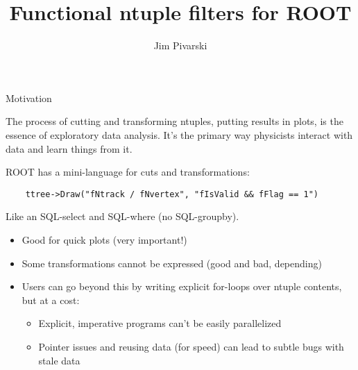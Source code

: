 \documentclass{beamer}
\title{Functional ntuple filters for ROOT}
\author{Jim Pivarski}
\begin{document}
\begin{frame}
  \titlepage
\end{frame}

\begin{frame}[fragile]{Motivation}

\begin{block}{}
The process of cutting and transforming ntuples, putting results in plots, is the essence of exploratory data analysis. It's the primary way physicists interact with data and learn things from it.
\end{block}

\begin{block}{}
ROOT has a mini-language for cuts and transformations:
{\scriptsize \begin{verbatim}
    ttree->Draw("fNtrack / fNvertex", "fIsValid && fFlag == 1")
\end{verbatim}}
Like an SQL-select and SQL-where (no SQL-groupby).
\end{block}

\begin{itemize}
\item Good for quick plots (very important!)
\item Some transformations cannot be expressed (good and bad, depending)
\item Users can go beyond this by writing explicit for-loops over ntuple contents, but at a cost:
\begin{itemize}
\item Explicit, imperative programs can't be easily parallelized
\item Pointer issues and reusing data (for speed) can lead to subtle bugs with stale data
\end{itemize}
\end{itemize}
\end{frame}
\end{document}

